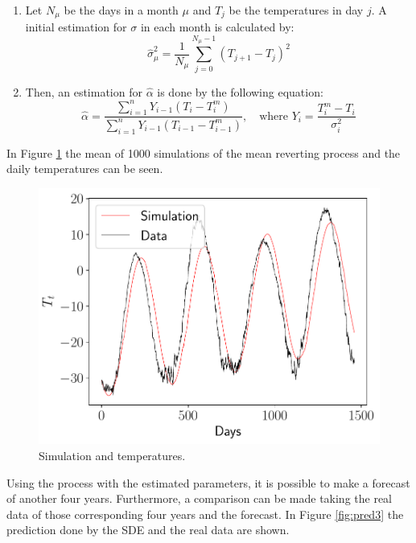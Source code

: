 \documentclass[11pt]{article}
\theoremstyle{definition}
\theoremstyle{remark}
\theoremstyle{remark}
\begin{document}
\begin{enumerate}
\item Let $N_\mu$ be the days in a month $\mu$ and $T_j$ be the
  temperatures in day $j$. A initial estimation for $\sigma$ in each month is
  calculated by:
  \begin{equation*}
    \hat{\sigma}_\mu^2 = \frac{1}{N_\mu}\sum_{j=0}^{N_\mu - 1} (T_{j+1} - T_j)^2
  \end{equation*}

\item Then, an estimation for $\hat{\alpha}$ is done by the following
  equation:
  \begin{equation*}
    \hat{\alpha} = \dfrac{\displaystyle\sum_{i=1}^nY_{i-1}(T_i - T_i^m)}{
      \displaystyle\sum_{i=1}^nY_{i-1} (T_{i-1} - T_{i-1}^m)}, \quad
    \text{where } Y_i = \frac{T_{i}^m - T_{i}}{\sigma_i^2}
  \end{equation*}
\end{enumerate}

In Figure \ref{fig:estimated3} the mean of 1000 simulations of the
mean reverting process and the daily temperatures can be seen.

\begin{figure}[H]
  \centering
  \includegraphics[scale=.5]{estimated_temps.pdf}
  \caption{Simulation and temperatures.}
  \label{fig:estimated3}
\end{figure}

Using the process with the estimated parameters, it is possible to
make a forecast of another four years. Furthermore, a comparison can be made
taking the real data of those corresponding four years and the forecast. In Figure
\ref{fig:pred3} the prediction done by the SDE and the real data are
shown.
\end{document}
